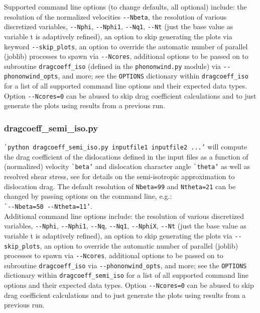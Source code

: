 \documentclass[11pt,letterpaper,oneside,pdftex]{article}
\begin{document}
Supported command line options (to change defaults, all optional) include:
the resolution of the normalized velocities \verb|--Nbeta|,
the resolution of various discretized variables, \verb|--Nphi|, \verb|--Nphi1|, \verb|--Nq1|, \verb|--Nt| (just the base value as variable t is adaptively refined),
an option to skip generating the plots via keyword \verb|--skip_plots|,
an option to override the automatic number of parallel (joblib) processes to spawn via \verb|--Ncores|,
additional options to be passed on to subroutine \verb|dragcoeff_iso| (defined in the \verb|phononwind.py| module) via \verb|--phononwind_opts|,
and more; see the \verb|OPTIONS| dictionary within \verb|dragcoeff_iso| for a list of all supported command line options and their expected data types.
Option \verb|--Ncores=0| can be abused to skip drag coefficient calculations and to just generate the plots using results from a previous run.



\subsubsection{dragcoeff\_semi\_iso.py}

\verb|`python dragcoeff_semi_iso.py inputfile1 inputfile2 ...’| will compute the drag coefficient of the dislocations defined in the input files as a function of (normalized) velocity \verb|`beta’| and dislocation character angle \verb|`theta’| as well as resolved shear stress, see \cite{Blaschke:2018anis,Blaschke:2019fits,Blaschke:2021impact} for details on the semi-isotropic approximation to dislocation drag.
The default resolution of \verb|Nbeta=99| and \verb|Ntheta=21| can be changed by passing options on the command line, e.g.:
\\\verb|`--Nbeta=50 --Ntheta=11’|.\\
Additional command line options include:
the resolution of various discretized variables, \verb|--Nphi|, \verb|--Nphi1|, \verb|--Nq|, \verb|--Nq1|, \verb|--NphiX|, \verb|--Nt| (just the base value as variable t is adaptively refined),
an option to skip generating the plots via \verb|--skip_plots|,
an option to override the automatic number of parallel (joblib) processes to spawn via \verb|--Ncores|,
additional options to be passed on to subroutine \verb|dragcoeff_iso| via \verb|--phononwind_opts|,
and more; see the \verb|OPTIONS| dictionary within \verb|dragcoeff_semi_iso| for a list of all supported command line options and their expected data types.
Option \verb|--Ncores=0| can be abused to skip drag coefficient calculations and to just generate the plots using results from a previous run.
\end{document}
